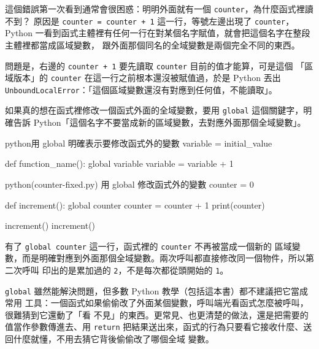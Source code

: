 這個錯誤第一次看到通常會很困惑：明明外面就有一個 \texttt{counter}，為什麼函式裡讀不到？
原因是 \texttt{counter = counter + 1} 這一行，等號左邊出現了 \texttt{counter}，Python
一看到函式主體裡有任何一行在對某個名字賦值，就會把這個名字在整段主體裡都當成區域變數，
跟外面那個同名的全域變數是兩個完全不同的東西。

問題是，右邊的 \texttt{counter + 1} 要先讀取 \texttt{counter} 目前的值才能算，可是這個
「區域版本」的 \texttt{counter} 在這一行之前根本還沒被賦值過，於是 Python 丟出
\texttt{UnboundLocalError}：「這個區域變數還沒有對應到任何值，不能讀取」。

如果真的想在函式裡修改一個函式外面的全域變數，要用 \texttt{global} 這個關鍵字，明確告訴
Python「這個名字不要當成新的區域變數，去對應外面那個全域變數」。

\begin{code}{python}{用 global 明確表示要修改函式外的變數}
variable = initial_value


def function_name():
    global variable
    variable = variable + 1
\end{code}

\begin{example}{python}{(counter-fixed.py) 用 global 修改函式外的變數}
counter = 0


def increment():
    global counter
    counter = counter + 1
    print(counter)


increment()
increment()
\end{example}


有了 \texttt{global counter} 這一行，函式裡的 \texttt{counter} 不再被當成一個新的
區域變數，而是明確對應到外面那個全域變數。兩次呼叫都直接修改同一個物件，所以第二次呼叫
印出的是累加過的 \texttt{2}，不是每次都從頭開始的 \texttt{1}。

\texttt{global} 雖然能解決問題，但多數 Python 教學（包括這本書）都不建議把它當成常用
工具：一個函式如果偷偷改了外面某個變數，呼叫端光看函式怎麼被呼叫，很難猜到它還動了「看
不見」的東西。更常見、也更清楚的做法，還是把需要的值當作參數傳進去、用 \texttt{return}
把結果送出來，函式的行為只要看它接收什麼、送回什麼就懂，不用去猜它背後偷偷改了哪個全域
變數。


